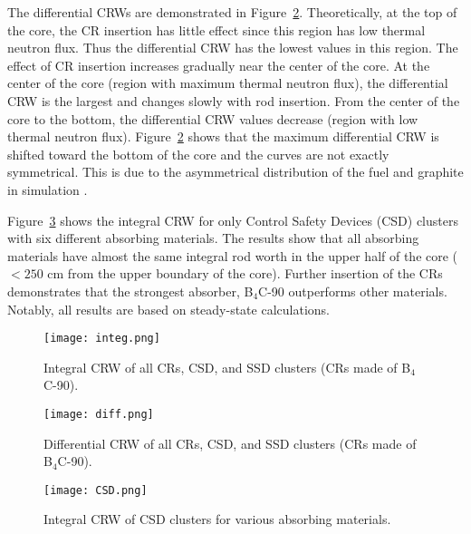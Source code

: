 The differential CRWs are demonstrated in Figure~\ref{fig:diff}. Theoretically, at the top of the core, the CR insertion has little effect since this region has low thermal neutron flux. Thus the differential CRW has the lowest values in this region. The effect of CR insertion increases gradually near the center of the core. At the center of the core (region with maximum thermal neutron flux), the differential CRW is the largest and changes slowly with rod insertion. From the center of the core to the bottom, the differential CRW values decrease (region with low thermal neutron flux). Figure~\ref{fig:diff} shows that the maximum differential CRW is shifted toward the bottom of the core and the curves are not exactly symmetrical. This is due to the asymmetrical distribution of the fuel and graphite in simulation \cite{xuemei2013study,son2016control}.

Figure~\ref{fig:CSD} shows the integral CRW for only Control Safety Devices (CSD) clusters with six 
different absorbing materials. The results show that all absorbing materials 
have almost the same integral rod worth in the upper half of the core 
($<250$ cm from the upper boundary of the core). Further insertion of the 
CRs demonstrates that the strongest absorber, B$_4$C-90 outperforms other materials.
Notably, all results are based on steady-state calculations. 

\begin{figure}
	\centering
	\texttt{[image: integ.png]}
	\vspace{-0.5in}
	\caption{Integral CRW of all CRs, CSD, and SSD clusters (CRs made of B$_4$C-90).} 
	\label{fig:integ}
\end{figure}
\begin{figure}
	\centering
	\texttt{[image: diff.png]}
	\vspace{-0.5in}
	\caption{Differential CRW of all CRs, CSD, and SSD clusters (CRs made of B$_4$C-90).} 
	\label{fig:diff}
\end{figure}
\begin{figure}
	\centering
	\texttt{[image: CSD.png]}
	\vspace{-0.5in}
	\caption{Integral CRW of CSD clusters for various absorbing materials.} 
	\label{fig:CSD}
\end{figure}